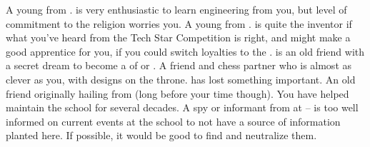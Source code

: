 \documentclass[char]{GL2020}
\begin{document}
\begin{itemz}[Notes]
	\item 
\end{itemz}

\begin{contacts}
	\contact{\cInitiate{}} A young \cInitiate{\person} from \pShip{}. \cInitiate{} is very enthusiastic to learn engineering from you, but \cInitiate{\their} level of commitment to the religion worries you.
	\contact{\cTechStar{}} A young \cTechStar{\person} from \pTech{}. \cTechStar{} is quite the inventor if what you’ve heard from the Tech Star Competition is right, and might make a good apprentice for you, if you could switch \cTechStar{\their} loyalties to the \pShip{}.
	\contact{\cPirate{}} \cPirate{} is an old friend with a secret dream to become a \cPirate{\cleric} of \cEbb{} or \cFlow{}.
	\contact{\cPrince{}} A friend and chess partner who is almost as clever as you, with designs on the \pFarm{} throne. \cPrince{} has lost something important.
\contact{\cPrincipal{}} An old friend originally hailing from \pShip{} (long before your time though). You have helped \cPrincipal{\them} maintain the school for several decades.
	 A spy or informant from \pFarm{} at \pSc{} -- \pFarm{} is too well informed on current events at the school to not have a source of information planted here.  If possible, it would be good to find and neutralize them.

\end{contacts}
\end{document}
